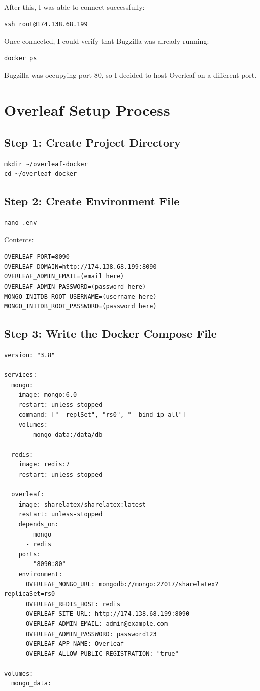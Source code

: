 After this, I was able to connect successfully:
\begin{verbatim}
ssh root@174.138.68.199
\end{verbatim}

Once connected, I could verify that Bugzilla was already running:
\begin{verbatim}
docker ps
\end{verbatim}

Bugzilla was occupying port 80, so I decided to host Overleaf on a different port.

\section{Overleaf Setup Process}

\subsection{Step 1: Create Project Directory}
\begin{verbatim}
mkdir ~/overleaf-docker
cd ~/overleaf-docker
\end{verbatim}

\subsection{Step 2: Create Environment File}
\begin{verbatim}
nano .env
\end{verbatim}

Contents:
\begin{verbatim}
OVERLEAF_PORT=8090
OVERLEAF_DOMAIN=http://174.138.68.199:8090
OVERLEAF_ADMIN_EMAIL=(email here)
OVERLEAF_ADMIN_PASSWORD=(password here)
MONGO_INITDB_ROOT_USERNAME=(username here)
MONGO_INITDB_ROOT_PASSWORD=(password here)
\end{verbatim}

\subsection{Step 3: Write the Docker Compose File}
\begin{verbatim}
version: "3.8"

services:
  mongo:
    image: mongo:6.0
    restart: unless-stopped
    command: ["--replSet", "rs0", "--bind_ip_all"]
    volumes:
      - mongo_data:/data/db

  redis:
    image: redis:7
    restart: unless-stopped

  overleaf:
    image: sharelatex/sharelatex:latest
    restart: unless-stopped
    depends_on:
      - mongo
      - redis
    ports:
      - "8090:80"
    environment:
      OVERLEAF_MONGO_URL: mongodb://mongo:27017/sharelatex?replicaSet=rs0
      OVERLEAF_REDIS_HOST: redis
      OVERLEAF_SITE_URL: http://174.138.68.199:8090
      OVERLEAF_ADMIN_EMAIL: admin@example.com
      OVERLEAF_ADMIN_PASSWORD: password123
      OVERLEAF_APP_NAME: Overleaf
      OVERLEAF_ALLOW_PUBLIC_REGISTRATION: "true"

volumes:
  mongo_data:
\end{verbatim}


